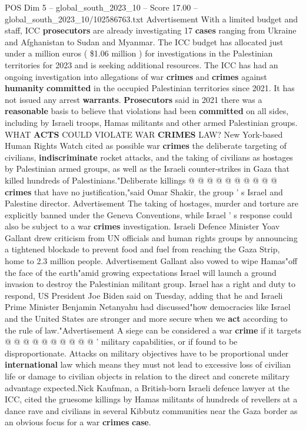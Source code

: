 \begin{textsample}{POS Dim 5 – global\_south\_2023\_10 – Score 17.00 – global\_south\_2023\_10/102586763.txt}
Advertisement With a limited budget and staff, ICC \textbf{prosecutors} are already investigating 17 \textbf{cases} ranging from Ukraine and Afghanistan to Sudan and Myanmar.
The ICC budget has allocated just under a million euros ( \$1.06 million ) for investigations in the Palestinian territories for 2023 and is seeking additional resources.
The ICC has had an ongoing investigation into allegations of war \textbf{crimes} and \textbf{crimes} against \textbf{humanity} \textbf{committed} in the occupied Palestinian territories since 2021.
It has not issued any arrest \textbf{warrants}. \textbf{Prosecutors} said in 2021 there was a \textbf{reasonable} basis to believe that violations had been \textbf{committed} on all sides, including by Israeli troops, Hamas militants and other armed Palestinian groups.
WHAT \textbf{ACTS} COULD VIOLATE WAR \textbf{CRIMES} LAW?
New York-based Human Rights Watch cited as possible war \textbf{crimes} the deliberate targeting of civilians, \textbf{indiscriminate} rocket attacks, and the taking of civilians as hostages by Palestinian armed groups, as well as the Israeli counter-strikes in Gaza that killed hundreds of Palestinians."Deliberate killings @ @ @ @ @ @ @ @ @ @ \textbf{crimes} that have no justification,"said Omar Shakir, the group ' s Israel and Palestine director.
Advertisement The taking of hostages, murder and torture are explicitly banned under the Geneva Conventions, while Israel ' s response could also be subject to a war \textbf{crimes} investigation.
Israeli Defence Minister Yoav Gallant drew criticism from UN officials and human rights groups by announcing a tightened blockade to prevent food and fuel from reaching the Gaza Strip, home to 2.3 million people.
Advertisement Gallant also vowed to wipe Hamas"off the face of the earth"amid growing expectations Israel will launch a ground invasion to destroy the Palestinian militant group.
Israel has a right and duty to respond, US President Joe Biden said on Tuesday, adding that he and Israeli Prime Minister Benjamin Netanyahu had discussed"how democracies like Israel and the United States are stronger and more secure when we \textbf{act} according to the rule of law."Advertisement A siege can be considered a war \textbf{crime} if it targets @ @ @ @ @ @ @ @ @ @ ' military capabilities, or if found to be disproportionate.
Attacks on military objectives have to be proportional under \textbf{international} law which means they must not lead to excessive loss of civilian life or damage to civilian objects in relation to the direct and concrete military advantage expected.Nick Kaufman, a British-born Israeli defence lawyer at the ICC, cited the gruesome killings by Hamas militants of hundreds of revellers at a dance rave and civilians in several Kibbutz communities near the Gaza border as an obvious focus for a war \textbf{crimes} \textbf{case}.

\end{textsample}
